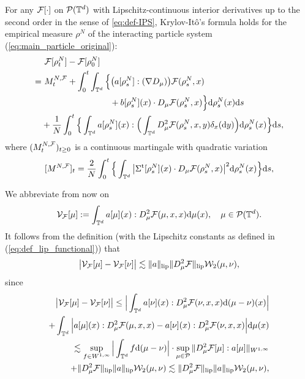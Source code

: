 \begin{prop}\label{prop:ito_particle}For any $\mathcal{F}[\cdot]$ on $\mathcal{P}(\mathbb{T}^d)$ with Lipschitz-continuous interior derivatives up to the second order in the sense of \eqref{eq:def-IPS}, Krylov-It\^o's formula holds for the empirical measure $\rho^N$ of the interacting particle system (\ref{eq:main_particle_original}): 
\begin{equation}\label{eq:ito_full}
\begin{split} & \ \mathcal{F}[\rho^N_t] - \mathcal{F}[\rho^N_0] \\
= & \ M^{N,\mathcal{F}}_t + \int_0^t\int_{\mathbb{T}^d} \Big\{\big(a[\rho_s^N]: (\nabla D_{\mu})\big)\mathcal{F}(\rho^N_s,x) \\
& \qquad\qquad\qquad\qquad+ b[\rho_s^N](x)\cdot D_{\mu}\mathcal{F}(\rho^N_s,x)\Big\}\mathrm{d}\rho_s^N(x)\mathrm{d}s\\
& + \frac{1}{N}\int_0^t \Big\{\int_{\mathbb{T}^d} a[\rho_s^N](x):\Big(\int_{\mathbb{T}^d} D^2_{\mu}\mathcal{F}(\rho_s^N, x, y)\delta_x(\mathrm{d}y)\Big) \mathrm{d}\rho^N_s(x)\Big\}\mathrm{d}s,
\end{split}
\end{equation}
where $(M^{N,\mathcal{F}}_t)_{t \geq 0}$ is a continuous martingale with quadratic variation 
$$
[M^{N,\mathcal{F}}]_t = \frac{2}{N}\int_0^t \Big\{\int_{\mathbb{T}^d} \big|\Sigma^{\operatorname{t}}[\rho^N_s](x) \cdot D_{\mu}\mathcal{F}(\rho^N_s,x)\big|^2\mathrm{d}\rho_s^N(x)\Big\}\mathrm{d}s,
$$
\end{prop}
We abbreviate from now on
\begin{equation}\label{eq:def_VF}
\mathcal{V}_{\mathcal{F}}[\mu] := \int_{\mathbb{T}^d}a[\mu](x): D^2_{\mu}\mathcal{F}(\mu, x, x)\mathrm{d}\mu(x), \quad \mu \in \mathcal{P}(\mathbb{T}^d).
\end{equation}
It follows from the definition (with the Lipschitz constants as defined in (\ref{eq:def_lip_functional})) that
\begin{equation}\label{eq:Lip_V_F_on_mu}
\begin{split}
    \big|\mathcal{V}_{\mathcal{F}}[\mu] - \mathcal{V}_{\mathcal{F}}[\nu]\big|  \lesssim \|a\|_{\operatorname{lip}} \|D^2_{\mu}\mathcal{F}\|_{\operatorname{lip}}\mathcal{W}_2(\mu,\nu),
\end{split} 
\end{equation}
since 
\begin{equation*}
\begin{split}
    \big|\mathcal{V}_{\mathcal{F}}[\mu] - \mathcal{V}_{\mathcal{F}}[\nu]\big| \leq \Big| \int_{\mathbb{T}^d} a[\nu](x): D^2_{\mu}\mathcal{F}(\nu, x, x)\mathrm{d}(\mu - \nu)(x)\Big| \\
    + \int_{\mathbb{T}^d} \Big| a[\mu](x): D^2_{\mu}\mathcal{F}(\mu, x, x) - a[\nu](x): D^2_{\mu}\mathcal{F}(\nu, x, x)\Big|\mathrm{d}\mu(x)\\
     \lesssim \sup_{f \in W^{1,\infty}}\Big|\int_{\mathbb{T}^d} f\mathrm{d}(\mu - \nu)\Big| \cdot \sup_{\mu \in \mathcal{P}}\|D^2_{\mu}\mathcal{F}[\mu]: a[\mu]\|_{W^{1,\infty}}
     \\+  \|D^2_{\mu}\mathcal{F}\|_{\operatorname{lip}}\|a\|_{\operatorname{lip}} \mathcal{W}_2(\mu,\nu)
      \lesssim \|D^2_{\mu}\mathcal{F}\|_{\operatorname{lip}}\|a\|_{\operatorname{lip}}\mathcal{W}_2(\mu,\nu),
\end{split} 
\end{equation*}
